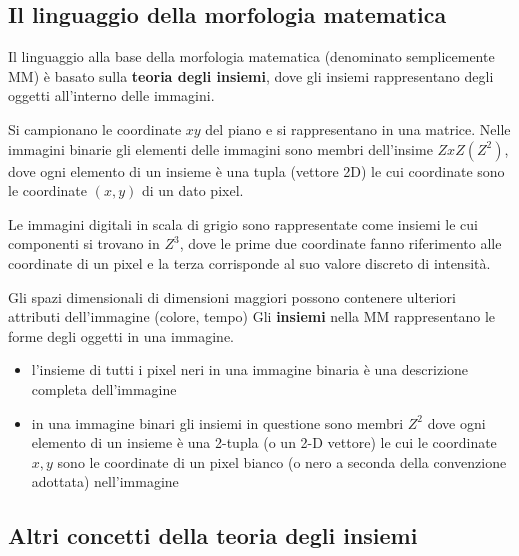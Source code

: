 \subsection{Il linguaggio della morfologia matematica}
Il linguaggio alla base della morfologia matematica (denominato semplicemente MM) è basato sulla \textbf{teoria degli insiemi}, dove gli insiemi rappresentano degli oggetti all'interno delle immagini.

Si campionano le coordinate $xy$ del piano e si rappresentano in una matrice. Nelle immagini binarie gli elementi delle immagini sono membri dell'insime $ZxZ(Z^2)$, dove ogni elemento di un insieme è una tupla (vettore 2D) le cui coordinate sono le coordinate $(x,y)$ di un dato pixel.

Le immagini digitali in scala di grigio sono rappresentate come insiemi le cui componenti si trovano in $Z^3$, dove le prime due coordinate fanno riferimento alle coordinate di un pixel e la terza corrisponde al suo valore discreto di intensità.

Gli spazi dimensionali di dimensioni maggiori possono contenere ulteriori attributi dell'immagine (colore, tempo)
Gli \textbf{insiemi} nella MM rappresentano le forme degli oggetti in una immagine.
\begin{itemize}
	\item l'insieme di tutti i pixel neri in una immagine binaria è una descrizione completa dell'immagine
	
	\item in una immagine binari gli insiemi in questione sono membri $Z^2$ dove ogni elemento di un insieme è una 2-tupla (o un 2-D vettore) le cui le coordinate $x, y$ sono le coordinate di un pixel bianco (o nero a seconda della convenzione adottata) nell'immagine
\end{itemize}

\subsection{Altri concetti della teoria degli insiemi}

